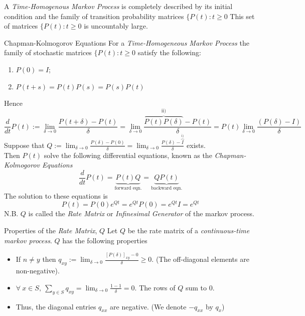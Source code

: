 \documentclass[11pt,a4paper]{article}
\begin{document}
  \begin{remark}{A \textit{Time-Homogenous Markov Process} is completely described by its initial condition and the family of transition probability matrices $\{P(t):t\geq0$}
    This set of matrices $\{P(t):t\geq0$ is uncountably large.
  \end{remark}

  \begin{definition}{Chapman-Kolmogorov Equations}
    For a \textit{Time-Homogeneous Markov Process} the family of stochastic matrices $\{P(t):t\geq0$ satisfy the following:
    \begin{enumerate}
      \item $P(0)=I$;
      \item $P(t+s)=P(t)P(s)=P(s)P(t)$
    \end{enumerate}
    Hence
    \[ \frac{d}{dt}P(t):=\lim_{\delta\to0}\frac{P(t+\delta)-P(t)}\delta=\lim_{\delta\to0}\frac{\overbrace{P(t)P(\delta)}^\text{ii)}-P(t)}\delta=P(t)\lim_{\delta\to0}\frac{(P(\delta)-I)}\delta \]
    Suppose that $Q:=\displaystyle\lim_{\delta\to0}\frac{P(\delta)-P(0)}\delta=\lim_{\delta\to0}\frac{P(\delta)-\overbrace{I}^\text{i)}}\delta$ exists.\\
    Then $P(t)$ solve the following differential equations, known as the \textit{Chapman-Kolmogorov Equations}
    \[ \frac{d}{dt}P(t)=\underbrace{P(t)Q}_\text{forward eqn.}=\underbrace{QP(t)}_\text{backward eqn.} \]
    The solution to these equations is
    \[ P(t)=P(0)e^{Qt}=e^{Qt}P(0)=e^{Qt}I=e^{Qt} \]
    N.B. $Q$ is called the \textit{Rate Matrix} or \textit{Infinesimal Generator} of the markov process.
  \end{definition}

  \begin{proposition}{Properties of the \textit{Rate Matrix}, $Q$}
    Let $Q$ be the rate matrix of a \textit{continuous-time markov process}. $Q$ has the following properties
    \begin{itemize}
      \item If $n\neq y$ then $\displaystyle q_{xy}:=\lim_{\delta\to0}\frac{[P(\delta)]_{xy}-0}\delta\geq0$. (The off-diagonal elements are non-negative).
      \item $\displaystyle\forall\ x\in S,\ \sum_{y\in S}q_{xy}=\lim_{\delta\to0}\frac{1-1}\delta=0$. The rows of $Q$ sum to 0.
      \item Thus, the diagonal entries $q_{xx}$ are negative. (We denote $-q_{xx}$ by $q_x$)
    \end{itemize}
  \end{proposition}
\end{document}
